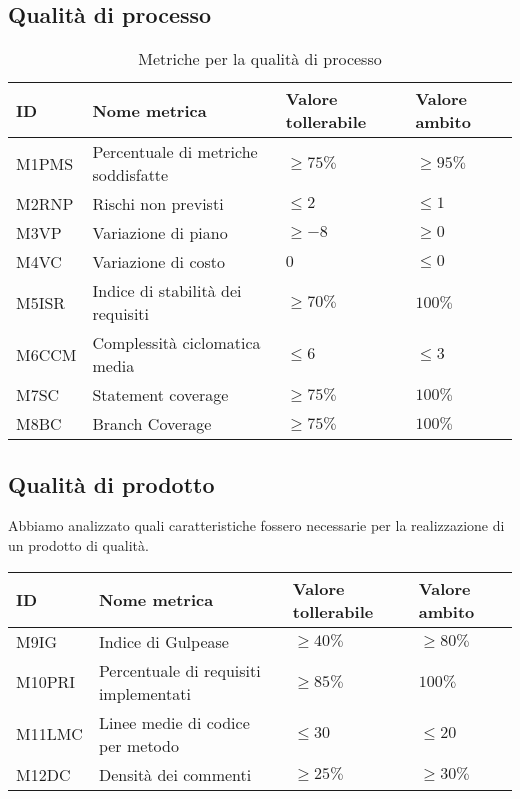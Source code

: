 \subsection{Qualità di processo}
 {\renewcommand{\arraystretch}{1.5}
 \begin{table}[H]
    \begin{tabularx}{\textwidth}{p{}|p{}|X|X}
    \textbf{ID} & \textbf{Nome metrica} & \textbf{Valore tollerabile} & \textbf{Valore ambito}  \\
    \hline
     M1PMS & Percentuale di metriche soddisfatte & $ \ge75\% $& $\ge95\% $\\
    \hline
     M2RNP & Rischi non previsti & $ \le2 $& $\le1 $\\
    \hline
     M3VP & Variazione di piano & $ \ge-8 $ & $ \ge0 $ \\
    \hline
     M4VC & Variazione di costo & $0$ & $\le0 $ \\
    \hline
     M5ISR &  Indice di stabilità dei requisiti & $ \ge70\% $ & $ 100\% $  \\
    \hline
     M6CCM & Complessità ciclomatica media & $\le6 $ & $\le3 $ \\
    \hline
    M7SC & Statement coverage & $ \ge75\% $ & $ 100\% $ \\
    
    \hline
     M8BC & Branch Coverage & $ \ge75\% $ & $ 100\% $ \\
    \end{tabularx}
    \caption{Metriche per la qualità di processo}
    \end{table}
    
\subsection{Qualità di prodotto}
Abbiamo analizzato quali caratteristiche fossero necessarie per la realizzazione di un prodotto di 
qualità.\\
 {\renewcommand{\arraystretch}{1.5}
 \begin{table}[H]
  \begin{tabularx}{\textwidth}{p{}|p{}|X|X}
    \textbf{ID} & \textbf{Nome metrica} & \textbf{Valore tollerabile} & \textbf{Valore ambito}  \\
    \hline
     M9IG & Indice di Gulpease & $ \ge40\% $& $\ge80\% $\\
    \hline
     M10PRI & Percentuale di requisiti implementati & $ \ge85\% $ & $ 100\% $ \\
    \hline
     M11LMC & Linee medie di codice per metodo & $\le30$ & $\le20$ \\
    \hline
    M12DC & Densità dei commenti & $\ge25\%$ & $\ge30\%$ \\
    

\end{tabularx}
\end{table}}}
